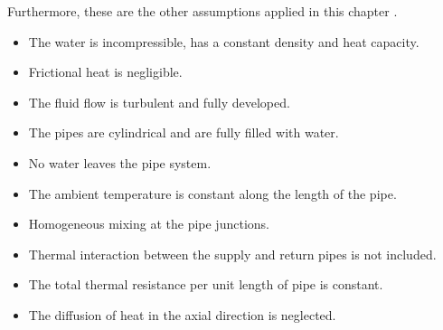 Furthermore, these are the other assumptions applied in this chapter \cite{MAURER2021244,sibeijn2025economic,KUNTUAROVA,PipePDE}.
\begin{itemize}
    \item The water is incompressible, has a constant density and heat capacity. 
    \item Frictional heat is negligible.
    \item The fluid flow is turbulent and fully developed.
    \item The pipes are cylindrical and are fully filled with water.
    \item No water leaves the pipe system.
    \item The ambient temperature is constant along the length of the pipe.
    \item Homogeneous mixing at the pipe junctions.
    \item Thermal interaction between the supply and return pipes is not included.
    \item The total thermal resistance per unit length of pipe is constant.
    \item The diffusion of heat in the axial direction is neglected. 
\end{itemize}


